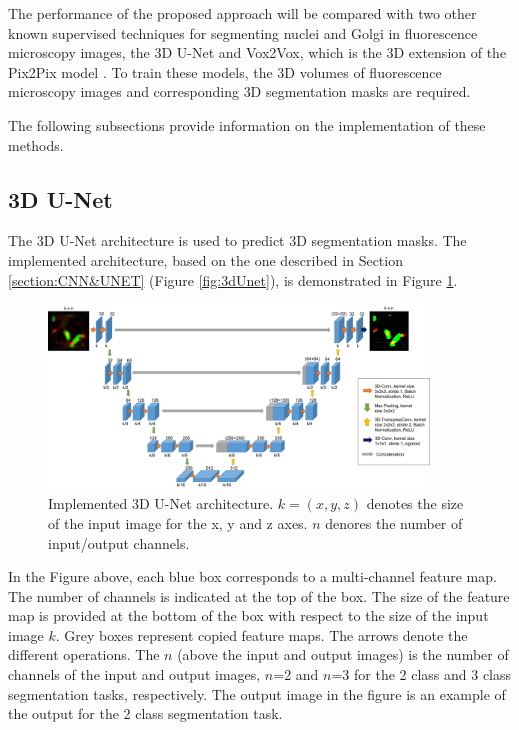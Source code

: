 The performance of the proposed approach will be compared with two other known supervised techniques for segmenting nuclei and Golgi in fluorescence microscopy images, the \ac{3D} U-Net \cite{Unet:3D} and Vox2Vox, which is the \ac{3D} extension of the Pix2Pix model \cite{isola2018imagetoimage}. To train these models, the \ac{3D} volumes of fluorescence microscopy images and corresponding \ac{3D} segmentation masks are required.

The following subsections provide information on the implementation of these methods.

\subsection{3D U-Net}

The \ac{3D} U-Net architecture is used to predict \ac{3D} segmentation masks. The implemented architecture, based on the one described in Section \ref{section:CNN&UNET} (Figure \ref{fig:3dUnet}), is demonstrated in Figure \ref{fig:y-unet-3d}.

\begin{figure}[!htb]
  \centering
  \includegraphics[width=0.90\textwidth]{Images/Picture1.jpg}
  \caption{Implemented \ac{3D} U-Net architecture. $k=(x,y,z)$ denotes the size of the input image for the x, y and z axes. $n$ denores the number of input/output channels.}
  \label{fig:y-unet-3d}
\end{figure}

In the Figure above, each blue box corresponds to a multi-channel feature map. The number of channels is indicated at the top of the box. The size of the feature map is provided at the bottom of the box with respect to the size of the input image $k$. Grey boxes represent copied feature maps. The arrows denote the different operations. The $n$ (above the input and output images) is the number of channels of the input and output images, $n$=2 and $n$=3 for the 2 class and 3 class segmentation tasks, respectively. The output image in the figure is an example of the output for the 2 class segmentation task.

